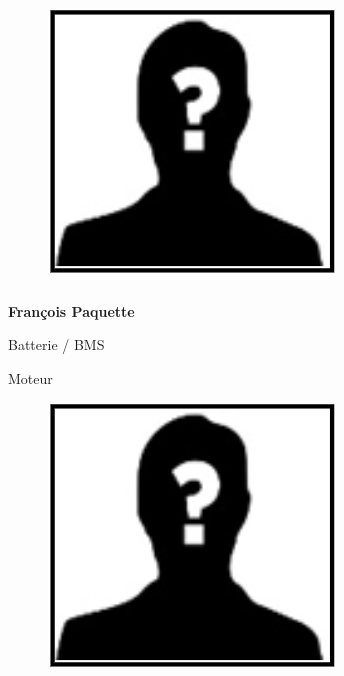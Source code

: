 \documentclass[a0paper,portrait]{baposter}
\begin{document}
\begin{poster}
{%
\begin{figure}
\includegraphics[width=0.9\linewidth]{img/membres/membre_placeholder.png} 
\end{figure}
\subsubsection*{}
\vspace{-2mm}
\textbf{François Paquette}

Batterie / BMS

Moteur

\begin{figure}
\includegraphics[width=.9\linewidth]{img/membres/membre_placeholder.png} 
\end{figure}
}
\end{poster}
\end{document}
